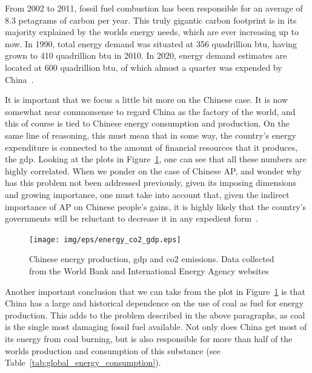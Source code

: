 From 2002 to 2011, fossil fuel combustion has been responsible for an
average of 8.3 petagrams of carbon per year. This truly gigantic carbon
footprint is in its majority explained by the worlds energy needs, which
are ever increasing up to now. In 1990, total energy demand was situated
at 356 quadrillion \gls{btu}, having grown to 410 quadrillion \gls{btu}
in 2010. In 2020, energy demand estimates are located at 600 quadrillion
\gls{btu}, of which almost a quarter was expended by
China~\cite{CABI2019}.

It is important that we focus a little bit more on the Chinese case. It
is now somewhat near commonsense to regard China as the factory of the
world, and this of course is tied to Chinese energy consumption and
production. On the same line of reasoning, this must mean that in some
way, the country's energy expenditure is connected to the amount of
financial resources that it produces, the \gls{gdp}. Looking at the
plots in Figure~\ref{fig:china_energy}, one can see that all these
numbers are highly correlated. When we ponder on the case of Chinese
\gls{AP}, and wonder why has this problem not been addressed previously,
given its imposing dimensions and growing importance, one must take into
account that, given the indirect importance of \gls{AP} on Chinese
people's gains, it is highly likely that the country's governments will
be reluctant to decrease it in any expedient form~\cite{CABI2019, IEA,
WorldBank}.

\begin{figure}[htpb]
    \centering
    \texttt{[image: img/eps/energy\_co2\_gdp.eps]}
    \caption{Chinese energy production, \gls{gdp} and \gls{co2}
    emissions.  Data collected from the World Bank and International
    Energy Agency websites~\cite{WorldBank, IEA}}
    \label{fig:china_energy}
\end{figure}

Another important conclusion that we can take from the plot in
Figure~\ref{fig:china_energy} is that China has a large and historical
dependence on the use of coal as fuel for energy production. This adds
to the problem described in the above paragraphs, as coal is the single
most damaging fossil fuel available. Not only does China get most of its
energy from coal burning, but is also responsible for more than half of
the worlds production and consumption of this substance (see
Table~\ref{tab:global_energy_consumption}).



